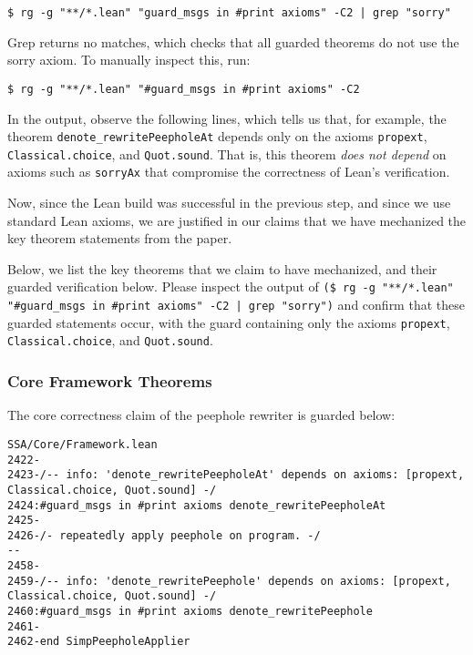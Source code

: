 \documentclass{sigplanconf}
\begin{document}
\begin{verbatim}
$ rg -g "**/*.lean" "guard_msgs in #print axioms" -C2 | grep "sorry"
\end{verbatim}

Grep returns no matches, which checks that all guarded theorems do not use the sorry axiom.
To manually inspect this, run:

\begin{verbatim}
$ rg -g "**/*.lean" "#guard_msgs in #print axioms" -C2
\end{verbatim}

In the output, observe the following lines, which tells us that, for example, the 
theorem \texttt{denote\_rewritePeepholeAt} depends only on the axioms 
\texttt{propext}, \texttt{Classical.choice}, and \texttt{Quot.sound}. That is, this theorem 
\emph{does not depend} on axioms such as \texttt{sorryAx} that compromise the correctness of Lean's verification.

Now, since the Lean build was successful in the previous step, and since we use standard Lean axioms, 
we are justified in our claims that we have mechanized the key theorem statements from the paper.

Below, we list the key theorems that we claim to have mechanized, and their 
guarded verification below. Please inspect the output of 
\texttt{(\$ rg -g "**/*.lean" "\#guard\_msgs in \#print axioms" -C2 | grep "sorry")}
and confirm that these guarded statements occur, with the guard containing only the axioms \texttt{propext},
\texttt{Classical.choice}, and \texttt{Quot.sound}.

\subsubsection{Core Framework Theorems}

The core correctness claim of the peephole rewriter is guarded below:

\begin{verbatim}
SSA/Core/Framework.lean
2422-
2423-/-- info: 'denote_rewritePeepholeAt' depends on axioms: [propext, Classical.choice, Quot.sound] -/
2424:#guard_msgs in #print axioms denote_rewritePeepholeAt
2425-
2426-/- repeatedly apply peephole on program. -/
--
2458-
2459-/-- info: 'denote_rewritePeephole' depends on axioms: [propext, Classical.choice, Quot.sound] -/
2460:#guard_msgs in #print axioms denote_rewritePeephole
2461-
2462-end SimpPeepholeApplier
\end{verbatim}
\end{document}
